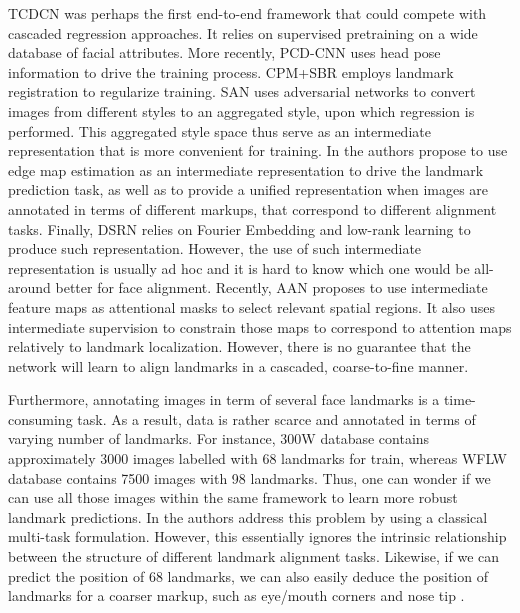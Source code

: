 \documentclass[10pt,twocolumn,letterpaper]{article}
\begin{document}
TCDCN \cite{zhang2016learning} was perhaps the first end-to-end framework that could compete with cascaded regression approaches. It relies on supervised pretraining on a wide database of facial attributes. More recently, PCD-CNN \cite{kumar2018disentangling} uses head pose information to drive the training process. CPM+SBR \cite{dong2018supervision} employs landmark registration to regularize training. SAN \cite{dong2018style} uses adversarial networks to convert images from different styles to an aggregated style, upon which regression is performed. This aggregated style space thus serve as an intermediate representation that is more convenient for training. In \cite{wu2018look} the authors propose to use edge map estimation as an intermediate representation to drive the landmark prediction task, as well as to provide a unified representation when images are annotated in terms of different markups, that correspond to different alignment tasks. Finally, DSRN \cite{miao2018direct} relies on Fourier Embedding and low-rank learning to produce such representation. However, the use of such intermediate representation is usually ad hoc and it is hard to know which one would be all-around better for face alignment. Recently, AAN \cite{yue2018attentional} proposes to use intermediate feature maps as attentional masks to select relevant spatial regions. It also uses intermediate supervision to constrain those maps to correspond to attention maps relatively to landmark localization. However, there is no guarantee that the network will learn to align landmarks in a cascaded, coarse-to-fine manner.

Furthermore, annotating images in term of several face landmarks is a time-consuming task. As a result, data is rather scarce and annotated in terms of varying number of landmarks. For instance, 300W database \cite{Sagonas2015} contains approximately 3000 images labelled with 68 landmarks for train, whereas WFLW database \cite{wu2018look} contains 7500 images with 98 landmarks. Thus, one can wonder if we can use all those images within the same framework to learn more robust landmark predictions. In \cite{wu2017leveraging} the authors address this problem by using a classical multi-task formulation. However, this essentially ignores the intrinsic relationship between the structure of different landmark alignment tasks. Likewise, if we can predict the position of 68 landmarks, we can also easily deduce the position of landmarks for a coarser markup, such as eye/mouth corners and nose tip \cite{liu2015deep}. 
\end{document}
